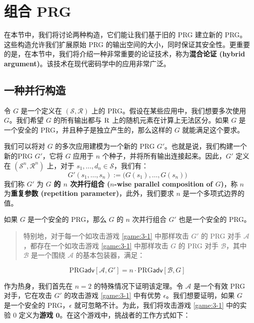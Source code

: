 \section{组合 PRG}\label{sec:3-4}

在本节中，我们将讨论两种构造，它们能让我们基于旧的 PRG 建立新的 PRG。这些构造允许我们扩展原始 PRG 的输出空间的大小，同时保证其安全性。更重要的是，在本节中，我们将介绍一种非常重要的论证技术，称为\textbf{混合论证 (hybrid argument)}。该技术在现代密码学中的应用非常广泛。

\subsection{一种并行构造}\label{subsec:3-4-1}

令 $G$ 是一个定义在 $(\mathcal S,\mathcal R)$ 上的 PRG。假设在某些应用中，我们想要多次使用 $G$。我们希望 $G$ 的所有输出都与 $\mathcal{\rm R}$ 上的随机元素在计算上无法区分。如果 $G$ 是一个安全的 PRG，并且种子是独立产生的，那么这样的 $G$ 就能满足这个要求。

我们可以将对 $G$ 的多次应用建模为一个新的 PRG $G'$。也就是说，我们构建一个新的PRG $G'$，它将 $G$ 应用于 $n$ 个种子，并将所有输出连接起来。因此，$G'$ 定义在 $(\mathcal S^n,\mathcal R^n)$ 上，对于 $s_1,\dots,d_n\in\mathcal S$，我们有：
\[
G'(s_1,\dots,s_n):=\big(G(s_1),\dots,G(s_n)\big)
\]
我们称 $G'$ 为 \textbf{$G$ 的 $n$ 次并行组合 ($n$-wise parallel composition of $G$)}，称 $n$ 为\textbf{重复参数 (repetition parameter)}，此外，我们要求 $n$ 是一个多项式边界的值。

\begin{theorem}\label{theo:3-2}
如果 $G$ 是一个安全的 PRG，那么 $G$ 的 $n$ 次并行组合 $G'$ 也是一个安全的 PRG。
\begin{quote}
特别地，对于每一个如攻击游戏 \ref{game:3-1} 中那样攻击 $G'$ 的 PRG 对手 $\mathcal A$，都存在一个如攻击游戏 \ref{game:3-1} 中那样攻击 $G$ 的 PRG 对手 $\mathcal B$，其中 $\mathcal B$ 是一个围绕 $\mathcal A$ 的基本包装器，满足：
\end{quote}
\[
\mathrm{PRG}\mathsf{adv}[\mathcal{A},G']
=n\cdot
\mathrm{PRG}\mathsf{adv}[\mathcal{B},G]
\]
\end{theorem}

作为热身，我们首先在 $n=2$ 的特殊情况下证明该定理。令 $\mathcal A$ 是一个有效 PRG 对手，它在攻击 $G'$ 的攻击游戏 \ref{game:3-1} 中有优势 $\epsilon$。我们想要证明，如果 $G$ 是一个安全的 PRG，$\epsilon$ 就可忽略不计。为此，我们将攻击游戏 \ref{game:3-1} 中的实验 $0$ 定义为\textbf{游戏 $\mathbf{0}$}。在这个游戏中，挑战者的工作方式如下：

